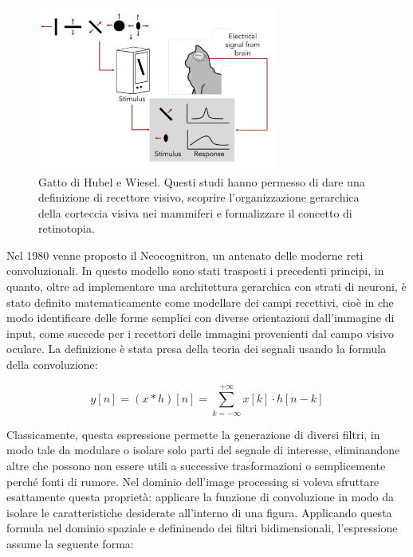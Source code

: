 \begin{figure}[htbp]
    \centering
    \includegraphics[width=0.7\textwidth]{figures/Hubel_and_Wiesel_cat.png}
    \caption{Gatto di Hubel e Wiesel\cite{b5catexp}. Questi studi hanno permesso di dare una definizione di recettore visivo, scoprire l'organizzazione gerarchica della corteccia visiva nei mammiferi e formalizzare il concetto di retinotopia.}
    \label{fig:chatto}
\end{figure}


\noindent Nel 1980 venne proposto il Neocognitron, un antenato delle moderne reti convoluzionali. In questo modello sono stati trasposti i precedenti principi, in quanto, oltre ad implementare una architettura gerarchica con strati di neuroni, è stato definito matematicamente come modellare dei campi recettivi, cioè in che modo identificare delle forme semplici con diverse orientazioni dall'immagine di input, come succede per i recettori delle immagini provenienti dal campo visivo oculare. La definizione è stata presa della teoria dei segnali usando la formula della convoluzione: 

\begin{equation} \label{eq:convolution}
y[n] = (x * h)[n] = \sum_{k=-\infty}^{+\infty} x[k] \cdot h[n - k]
\end{equation}

\noindent Classicamente, questa espressione permette la generazione di diversi filtri, in modo tale da modulare o isolare solo parti del segnale di interesse, eliminandone altre che possono non essere utili a successive trasformazioni o semplicemente perché fonti di rumore. Nel dominio dell'image processing si voleva sfruttare esattamente questa proprietà: applicare la funzione di convoluzione in modo da isolare le caratteristiche desiderate all'interno di una figura. Applicando questa formula nel dominio spaziale e defininendo dei filtri bidimensionali, l'espressione assume la seguente forma: 

